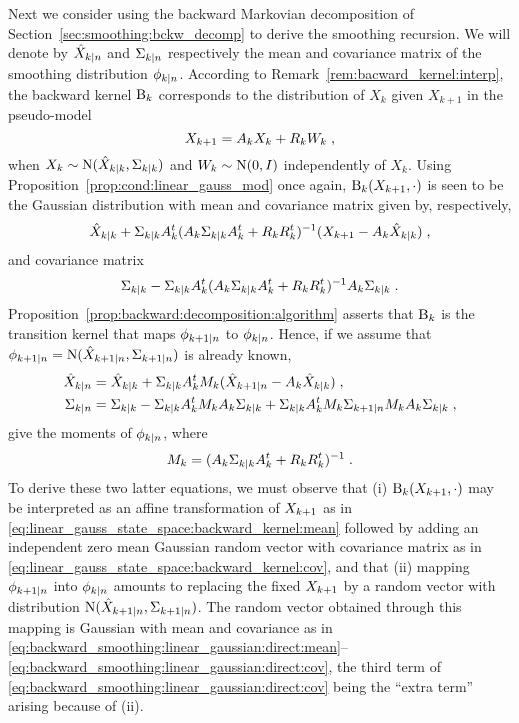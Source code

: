 Next we consider using the backward Markovian decomposition of
Section~\ref{sec:smoothing:bckw_decomp} to derive the smoothing
recursion. We will denote by $\hat{X}_{k|n}$ and $\Sigma_{k|n}$
respectively the mean and covariance matrix of the smoothing
distribution $\post{k}{n}$. According to
Remark~\ref{rem:bacward_kernel:interp}, the backward kernel
$\BK{k}$ corresponds to the distribution of $X_k$ given $X_{k+1}$
in the pseudo-model
\[
  X_{k+1} = A_k X_k + R_k W_k \; ,
\]
when $X_k \sim \operatorname{N}(\hat{X}_{k|k},\Sigma_{k|k})$ and $W_k \sim
\operatorname{N}(0,I)$ independently of $X_k$. Using
Proposition~\ref{prop:cond:linear_gauss_mod} once again,
$\BK{k}(X_{k+1},\cdot)$ is seen to be the Gaussian distribution with
mean and covariance matrix given by, respectively,
\begin{equation}
  \label{eq:linear_gauss_state_space:backward_kernel:mean}
  \hat{X}_{k|k} + \Sigma_{k|k} A_k^t (A_k \Sigma_{k|k} A_k^t + R_k R_k^t)^{-1}(X_{k+1}-A_k \hat{X}_{k|k}) \; ,
\end{equation}
and covariance matrix
\begin{equation}
  \label{eq:linear_gauss_state_space:backward_kernel:cov}
  \Sigma_{k|k} - \Sigma_{k|k} A_k^t (A_k \Sigma_{k|k} A_k^t + R_k R_k^t)^{-1} A_k \Sigma_{k|k} \; .
\end{equation}
Proposition~\ref{prop:backward:decomposition:algorithm} asserts
that $\BK{k}$ is the transition kernel that maps $\post{k+1}{n}$
to $\post{k}{n}$. Hence, if we assume that $\post{k+1}{n} =
\gauss(\postmean{k+1}{n},\postcov{k+1}{n})$ is already known,
\begin{align}
  \hat{X}_{k|n} & = \hat{X}_{k|k} + \Sigma_{k|k} A_k^t M_k (\hat{X}_{k+1|n}-A_k \hat{X}_{k|k}) \; , \label{eq:backward_smoothing:linear_gaussian:direct:mean}\\
  \Sigma_{k|n} & =  \Sigma_{k|k} - \Sigma_{k|k} A_k^t M_k A_k \Sigma_{k|k}
  + \Sigma_{k|k} A_k^t M_k \Sigma_{k+1|n} M_k A_k \Sigma_{k|k} \; , \label{eq:backward_smoothing:linear_gaussian:direct:cov}
\end{align}
give the moments of $\post{k}{n}$, where
\[
  M_k = (A_k \Sigma_{k|k} A_k^t + R_k R_k^t)^{-1} \; .
\]
To derive these two latter equations, we must observe that (i)
$\BK{k}(X_{k+1},\cdot)$ may be interpreted as an affine transformation
of $X_{k+1}$ as in \eqref{eq:linear_gauss_state_space:backward_kernel:mean}
followed by adding an independent zero mean Gaussian random vector
with covariance matrix as in
\eqref{eq:linear_gauss_state_space:backward_kernel:cov},
and that (ii) mapping $\post{k+1}{n}$ into $\post{k}{n}$ amounts to
replacing the fixed $X_{k+1}$ by a random vector
with distribution $\operatorname{N}(\hat{X}_{k+1|n},\Sigma_{k+1|n})$.
The random vector obtained through this mapping
is Gaussian with mean and covariance as in
\eqref{eq:backward_smoothing:linear_gaussian:direct:mean}--\eqref{eq:backward_smoothing:linear_gaussian:direct:cov}, the third term of
\eqref{eq:backward_smoothing:linear_gaussian:direct:cov} being the
``extra term'' arising because of (ii).

